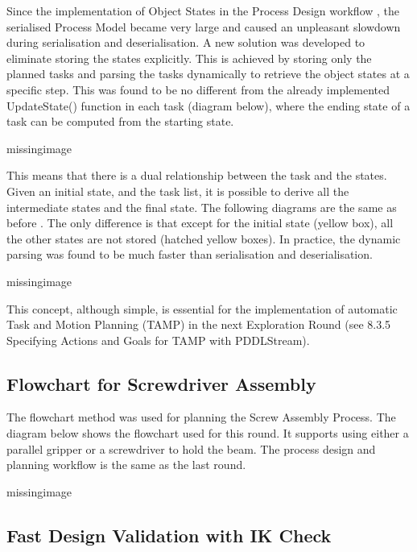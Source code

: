 Since the implementation of Object States in the Process Design workflow , the serialised Process Model became very large and caused an unpleasant slowdown during serialisation and deserialisation. A new solution was developed to eliminate storing the states explicitly. 
This is achieved by storing only the planned tasks and parsing the tasks dynamically to retrieve the object states at a specific step. This was found to be no different from the already implemented UpdateState() function in each task (diagram below), where the ending state of a task can be computed from the starting state. 

missingimage

This means that there is a dual relationship between the task and the states. Given an initial state, and the task list, it is possible to derive all the intermediate states and the final state. The following diagrams are the same as before . The only difference is that except for the initial state (yellow box), all the other states are not stored (hatched yellow boxes). In practice, the dynamic parsing was found to be much faster than serialisation and deserialisation.

missingimage

This concept, although simple, is essential for the implementation of automatic Task and Motion Planning (TAMP) in the next Exploration Round (see 8.3.5 Specifying Actions and Goals for TAMP with PDDLStream).

\subsection{Flowchart for Screwdriver Assembly}
\label{subsection:exploration-4-flowchart-for-screwdriver-assembly}

The flowchart method  was used for planning the Screw Assembly Process. The diagram below shows the flowchart used for this round. It supports using either a parallel gripper or a screwdriver to hold the beam. The process design and planning workflow is the same as the last round.

missingimage

\subsection{Fast Design Validation with IK Check}
\label{subsection:exploration-4-fast-design-validation-with-ik-check}


